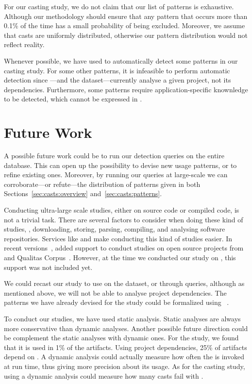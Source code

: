 For our casting study,
we do not claim that our list of patterns is exhaustive.
Although our methodology should ensure that any pattern that occurs more
than 0.1\% of the time has a small probability of being excluded.
Moreover, we assume that casts are uniformly distributed,
otherwise our pattern distribution would not reflect reality.

Whenever possible,
we have used \ql{} to automatically detect some patterns in our casting study.
For some other patterns, it is infeasible to perform automatic detection since \ql{}---and the \lgtm{} dataset---currently analyse a given project,
not its dependencies.
Furthermore, some patterns require application-specific knownledge to be detected,
which cannot be expressed in \ql{}.


\section{Future Work}

A possible future work could be to run our detection queries on the entire \lgtm{} database.
This can open up the possibility to devise new usage patterns,
or to refine existing ones.
Moreover,
by running our queries at large-scale we can corroborate---or refute---the distribution of patterns given in both Sections~\ref{sec:casts:overview} and~\ref{sec:casts:patterns}.

Conducting ultra-large scale studies, either on source code or compiled code, is not a trivial task.
There are several factors to consider when doing these kind of studies,
\eg{}, downloading, storing, parsing, compiling,
and analysing software repositories.
Services like \boa{} and \lgtm{} make conducting this kind of studies easier.
In recent versions~\citep{boa-github},
\boa{} added support to conduct studies on open source projects from \github{} and Qualitas Corpus~\citep{temperoQualitasCorpusCurated2010}.
However, at the time we conducted our study on \unsafe{},
this support was not included yet.

We could recast our \unsafe{} study to use \boa{} on the \github{} dataset,
or \lgtm{} through \ql{} queries, although as mentioned above,
we will not be able to analyse project dependencies.
The patterns we have already devised for the \unsafe{} study could be formalized using \ql{}~\citep{avgustinovQLObjectorientedQueries2016}.

To conduct our studies, we have used static analysis.
Static analyses are always more conservative than dynamic analyses.
Another possible future direction could be complement the static analyses with dynamic ones.
For the \unsafe{} study,
we found that it is used in 1\% of the \mavencentral{} artifacts.
Using project dependencies, 25\% of artifacts depend on \smu{}.
A dynamic analysis could actually measure how often the \unsafe{} \api{} is invoked at run time,
thus giving more precision about its usage.
As for the casting study,
using a dynamic analysis could measure how many casts fail with .

